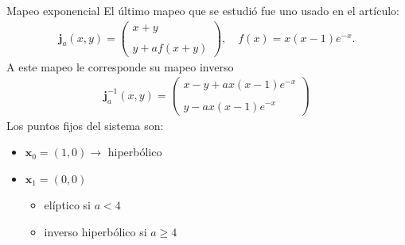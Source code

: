 \documentclass[11pt]{beamer}
\theoremstyle{definition}
\begin{document}
\begin{frame}{Mapeo exponencial}
El último mapeo que se estudió fue uno usado en el artículo: 
\begin{eqnarray}
\mathbf{j}_{a}(x,y)=\left(\begin{array}{lcc}
x+y\\
\\ y+af(x+y)
\end{array}\right), \quad f(x)=x(x-1)e^{-x}.
\label{Jung}
\end{eqnarray}
A este mapeo le corresponde su mapeo inverso
\begin{eqnarray}
\mathbf{j}^{-1}_{a}(x,y)=\left(\begin{array}{lcc}
x-y+ax(x-1)e^{-x}\\
\\ y-ax(x-1)e^{-x}
\end{array}\right)
\label{jungI}
\end{eqnarray}
Los puntos fijos del sistema son:
\begin{itemize}
\item $\mathbf{x}_{0}=(1,0) \rightarrow$ hiperb\'olico
\item $\mathbf{x}_{1}=(0,0)$  
\begin{itemize}
\item el\'iptico si $a<4$
\item inverso hiperb\'olico si $a \geq 4$
\end{itemize}
\end{itemize}

\end{frame}
\end{document}
